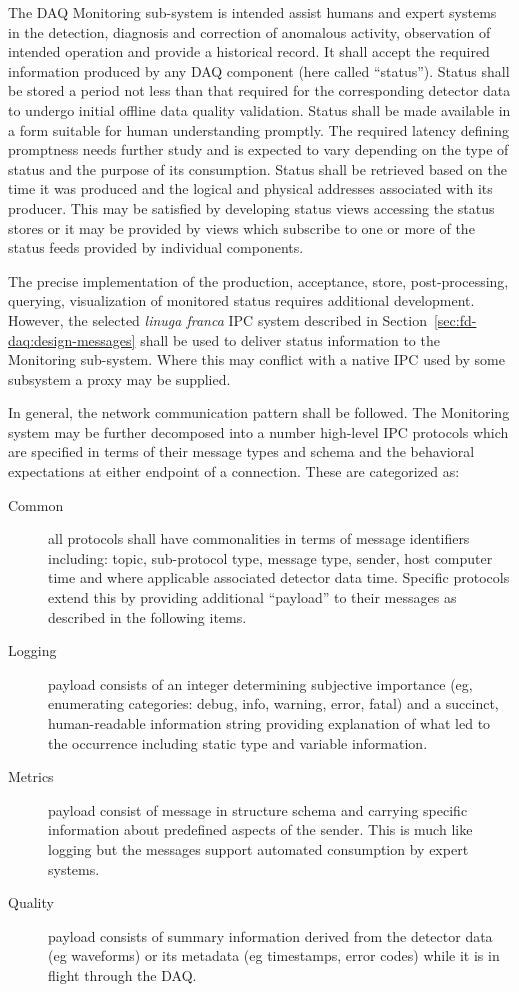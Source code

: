 The DAQ Monitoring sub-system is intended assist humans and expert systems in the detection, diagnosis and correction of anomalous activity, observation of intended operation and provide a historical record.
It shall accept the required information produced by any DAQ component (here called ``status'').
Status shall be stored a period not less than that required for the corresponding detector data to undergo initial offline data quality validation.
Status shall be made available in a form suitable for human understanding promptly. 
The required latency defining promptness needs further study and is expected to vary depending on the type of status and the purpose of its consumption.  
Status shall be retrieved based on the time it was produced and the logical and physical addresses associated with its producer.
This may be satisfied by developing status views accessing the status stores or it may be provided by views which subscribe to one or more of the status feeds provided by individual components.

The precise implementation of the production, acceptance, store, post-processing, querying, visualization of monitored status requires additional development. 
However, the selected \textit{linuga franca} IPC system described in Section~\ref{sec:fd-daq:design-messages} shall be used to deliver status information to the Monitoring sub-system. 
Where this may conflict with a native IPC used by some subsystem a proxy may be supplied. 

In general, the  network communication pattern shall be followed. 
The Monitoring system may be further decomposed into a number high-level IPC protocols which are specified in terms of their message types and schema and the behavioral expectations at either endpoint of a connection.
These are categorized as:


\begin{description}
\item[Common] all protocols shall have commonalities in terms of message identifiers including:  topic, sub-protocol type, message type, sender, host computer time and where applicable associated detector data time.  Specific protocols extend this by providing additional ``payload'' to their messages as described in the following items.
 
\item[Logging] payload consists of an integer determining subjective importance (eg, enumerating categories: debug, info, warning, error, fatal) and a succinct, human-readable information string providing explanation of what led to the occurrence including static type and variable information. 
\item[Metrics] payload consist of message in structure schema and carrying specific information about predefined aspects of the sender.  This is much like logging but the messages support automated consumption by expert systems.  
\item[Quality] payload consists of summary information derived from the detector data (eg waveforms) or its metadata (eg timestamps, error codes) while it is in flight through the DAQ.
\end{description}

